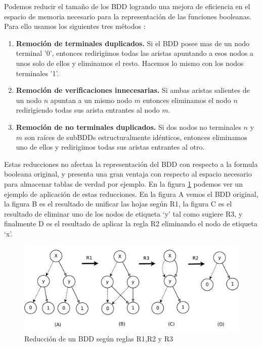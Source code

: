 \documentclass[titlepage, 12pt]{book}
\begin{document}
Podemos reducir el tamaño de los BDD logrando una mejora de eficiencia en el espacio de memoria necesario para la representación de las funciones booleanas. Para ello usamos los siguientes tres métodos \cite{Huth}:
\begin{enumerate}[R1--]
\item \textbf{Remoción de terminales duplicados.} Si el BDD posee mas de un nodo terminal '0', entonces redirigimos todas las aristas apuntando a esos nodos a unos solo de ellos y eliminamos el resto. Hacemos lo mismo con los nodos terminales '1'.
\item \textbf{Remoción de verificaciones innecesarias.} Si ambas aristas salientes de un nodo $n$ apuntan a un mismo nodo $m$ entonces eliminamos el nodo $n$ redirigiendo todas sus arista entrantes al nodo $m$.
\item \textbf{Remoción de no terminales duplicados.} Si dos nodos no terminales $n$ y $m$ son raíces de subBDDs estructuralmente idénticos, entonces eliminamos uno de ellos y redirigimos todas sus aristas entrantes al otro.
\end{enumerate}
Estas reducciones no afectan la representación del BDD con respecto a la formula booleana original, y presenta una gran ventaja con respecto al espacio necesario para almacenar tablas de verdad por ejemplo. En la figura \ref{reduccionBDD} podemos ver un ejemplo de aplicación de estas reducciones. En la figura A vemos el BDD original, la figura B es el resultado de unificar las hojas según R1, la figura C es el resultado de eliminar uno de los nodos de etiqueta `y' tal como sugiere R3, y finalmente D es el resultado de aplicar la regla R2 eliminando el nodo de etiqueta `x'.

\begin{figure}[H]
  \centering
    \includegraphics[scale=0.75]{Imagenes/reduccionBDD.pdf}
  \caption{Reducción de un BDD según reglas R1,R2 y R3}
  \label{reduccionBDD}
\end{figure}
~\\
\end{document}
